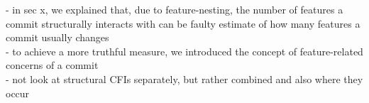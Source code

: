 - in sec x, we explained that, due to feature-nesting, the number of features a commit structurally interacts with can be faulty estimate of how many features a commit usually changes \\
- to achieve a more truthful measure, we introduced the concept of feature-related concerns of a commit  \\
- not look at structural CFIs separately, but rather combined and also where they occur










































